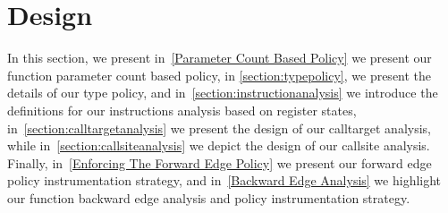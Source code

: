 \section{Design}
\label{chapter:Design}

In this section, we present 
in~\cref{Parameter Count Based Policy} we present our function parameter count based policy,
in \cref{section:typepolicy}, we present the details of our type policy, and 
in~\cref{section:instructionanalysis} we introduce the definitions for our instructions analysis based on register states,  
in~\cref{section:calltargetanalysis} we present the design of our calltarget analysis, while
in~\cref{section:callsiteanalysis} we depict the design of our callsite analysis.
Finally,  
in~\cref{Enforcing The Forward Edge Policy} we present our forward edge policy instrumentation strategy, and 
in~\cref{Backward Edge Analysis} we highlight our function backward edge analysis and policy instrumentation strategy.

